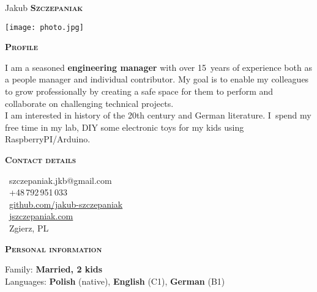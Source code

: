\documentclass[11pt, a4paper]{article}
\newcommand{\headleft}[1]{\vspace*{3ex}\textsc{\textbf{#1}}\par%
    \vspace*{-1.5ex}\hrulefill\par\vspace*{0.7ex}}
\begin{document}
\setlength{\topskip}{0pt}
\setlength{\parindent}{0pt}
\setlength{\parskip}{0pt}
\setlength{\fboxsep}{0pt}
\pagestyle{empty}
\raggedbottom

\begin{minipage}[t]{0.33\textwidth} %
\colorbox{cvblue}{\begin{minipage}[t][5mm][t]{\textwidth}\null\hfill\null\end{minipage}}

\vspace{-.2ex} %
\colorbox{cvblue!90}{\color{white}  %
\textwidth\relax%
\begin{minipage}[t][293mm][t]{0.82\textwidth}
\raggedright
\vspace*{2.5ex}

\Large Jakub \textbf{\textsc{Szczepaniak}} \normalsize 

\null\hfill\texttt{[image: photo.jpg]}\hfill\null

\vspace*{0.5ex} %

\headleft{Profile}
I am a seasoned \textbf{engineering manager} with over 15~years of experience both as a people manager and individual contributor.
My goal is to enable my colleagues to grow professionally by creating a safe space for them to perform and collaborate on challenging technical projects.\\
I am interested in history of the 20th century and German literature.
I~spend my free time in my lab, DIY some electronic toys for my kids using RaspberryPI/Arduino.

\headleft{Contact details}
\small %
\MVAt\ {\small szczepaniak.jkb@gmail.com} \\[0.4ex]
\Mobilefone\ +48\,792\,951\,033 \\[0.5ex]
\Mundus\ \href{https://github.com/jakub-szczepaniak}{github.com/jakub-szczepaniak} \\[0.1ex]
\Mundus\ \href{https://jszczepaniak.com}{jszczepaniak.com} \\[0.1ex]
\Letter\ Zgierz, PL
\normalsize

\headleft{Personal information}
Family: \textbf{Married, 2 kids} \\[0.5ex]
Languages: \textbf{Polish} (native), \textbf{English} (C1), \textbf{German} (B1)


\end{minipage}}
\end{minipage}
\end{document}
